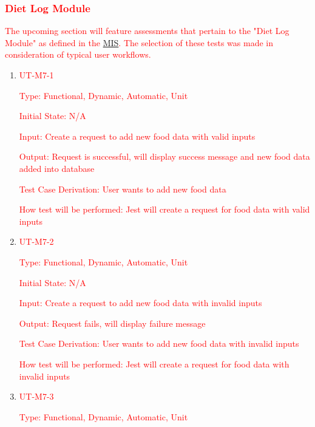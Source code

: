 \documentclass[12pt, titlepage]{article}
\begin{document}
\subsubsection{\textcolor{red}{Diet Log Module}}

\textcolor{red}{The upcoming section will feature assessments that pertain to the "Diet Log Module" as defined in the \href{https://github.com/BillNguyen1999/REVITALIZE/blob/main/docs/Design/SoftDetailedDes/MIS.pdf}{\color{blue}MIS}. The selection of these tests was made in consideration of typical user workflows.}

\begin{enumerate}

	\item{\textcolor{red}{UT-M7-1\\}}

	\textcolor{red}{Type: Functional, Dynamic, Automatic, Unit}

	\textcolor{red}{Initial State: N/A}

	\textcolor{red}{Input: Create a request to add new food data with valid inputs}

	\textcolor{red}{Output: Request is successful, will display success message and new food data added into database}

	\textcolor{red}{Test Case Derivation: User wants to add new food data}

	\textcolor{red}{How test will be performed: Jest will create a request for food data with valid inputs}

	\item{\textcolor{red}{UT-M7-2\\}}

	\textcolor{red}{Type: Functional, Dynamic, Automatic, Unit}

	\textcolor{red}{Initial State: N/A}

	\textcolor{red}{Input: Create a request to add new food data with invalid inputs}

	\textcolor{red}{Output: Request fails, will display failure message}

	\textcolor{red}{Test Case Derivation: User wants to add new food data with invalid inputs}

	\textcolor{red}{How test will be performed: Jest will create a request for food data with invalid inputs}

        \item{\textcolor{red}{UT-M7-3\\}}

	\textcolor{red}{Type: Functional, Dynamic, Automatic, Unit}


\end{enumerate}
\end{document}
